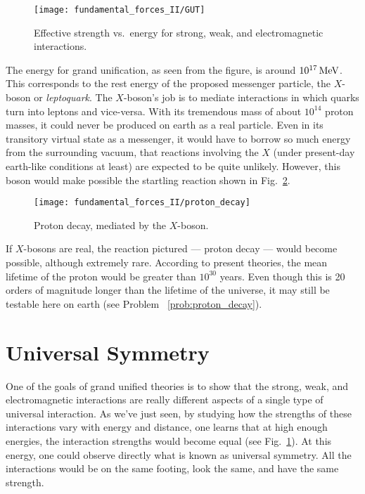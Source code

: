 \begin{figure}[tbp]
\begin{center}
\texttt{[image: fundamental\_forces\_II/GUT]}
\caption{Effective strength vs.\ energy for strong, weak, and
  electromagnetic interactions.}
\label{fig:GUT}
\end{center}
\end{figure}

The energy for grand unification, as seen from the figure, is around
$10^{17}\,\mbox{MeV}$. This corresponds to the rest energy of the proposed
messenger particle, the $X$-boson or {\em leptoquark}.  The
$X$-boson's job is to mediate interactions in which quarks turn into
leptons and vice-versa.  With its tremendous mass of about $10^{14}$
proton masses, it could never be produced on earth as a real particle.
Even in its transitory virtual state as a messenger, it would have to
borrow so much energy from the surrounding vacuum, that reactions
involving the $X$ (under present-day earth-like conditions at least)
are expected to be quite unlikely.  However, this boson would make
possible the startling reaction shown in Fig.~\ref{fig:proton_decay}.

\begin{figure}[tbp]
\begin{minipage}{7.5cm}
\caption{Proton decay, mediated by the $X$-boson.}
\label{fig:proton_decay}
\end{minipage}
\begin{minipage}{3cm}
\texttt{[image: fundamental\_forces\_II/proton\_decay]}
\end{minipage}
\end{figure}

If $X$-bosons are real, the reaction pictured --- proton decay ---
would become possible, although extremely rare.  According to present
theories, the mean lifetime of the proton would be greater than $10^{30}$
years.  Even though this is 20 orders of magnitude longer than the
lifetime of the universe, it may still be testable here on earth (see
Problem~
\ref{prob:proton_decay}).

\section{Universal Symmetry}

One of the goals of grand unified theories is to show that the strong,
weak, and electromagnetic interactions are really different aspects of
a single type of universal interaction.  As we've just seen, by
studying how the strengths of these interactions vary with energy and
distance, one learns that at high enough energies, the interaction
strengths would become equal (see Fig.~\ref{fig:GUT}).  At this
energy, one could observe directly what is known as universal
symmetry.  All the interactions would be on the same footing, look the
same, and have the same strength.

